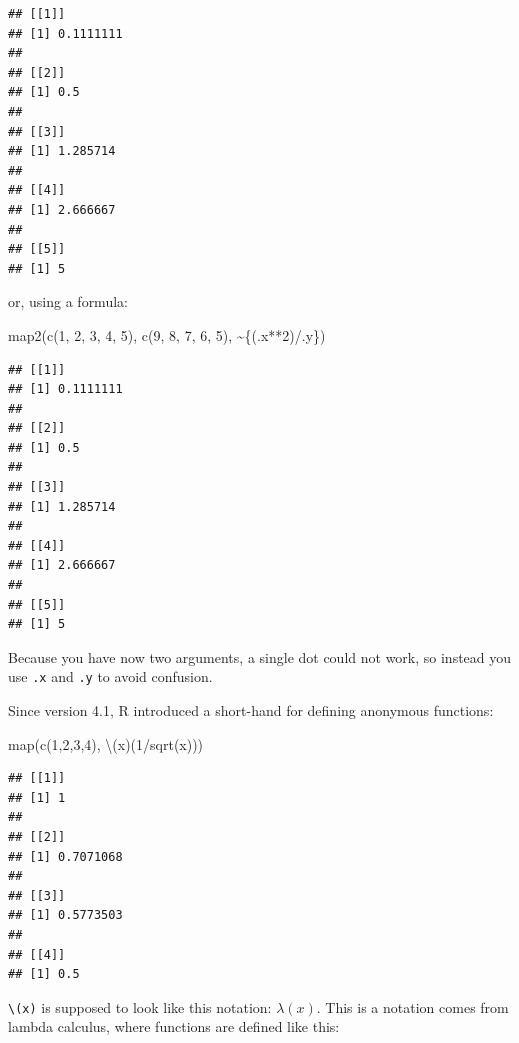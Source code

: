 \documentclass[
]{article}
\newenvironment{Shaded}{\begin{snugshade}}{\end{snugshade}}
\newcommand{\DecValTok}[1]{\textcolor[rgb]{0.00,0.00,0.81}{#1}}
\newcommand{\FunctionTok}[1]{\textcolor[rgb]{0.00,0.00,0.00}{#1}}
\newcommand{\NormalTok}[1]{#1}
\newcommand{\SpecialCharTok}[1]{\textcolor[rgb]{0.00,0.00,0.00}{#1}}
\begin{document}
\begin{verbatim}
## [[1]]
## [1] 0.1111111
## 
## [[2]]
## [1] 0.5
## 
## [[3]]
## [1] 1.285714
## 
## [[4]]
## [1] 2.666667
## 
## [[5]]
## [1] 5
\end{verbatim}

or, using a formula:

\begin{Shaded}
\begin{Highlighting}[]
\FunctionTok{map2}\NormalTok{(}\FunctionTok{c}\NormalTok{(}\DecValTok{1}\NormalTok{, }\DecValTok{2}\NormalTok{, }\DecValTok{3}\NormalTok{, }\DecValTok{4}\NormalTok{, }\DecValTok{5}\NormalTok{), }\FunctionTok{c}\NormalTok{(}\DecValTok{9}\NormalTok{, }\DecValTok{8}\NormalTok{, }\DecValTok{7}\NormalTok{, }\DecValTok{6}\NormalTok{, }\DecValTok{5}\NormalTok{), }\SpecialCharTok{\textasciitilde{}}\NormalTok{\{(.x}\SpecialCharTok{**}\DecValTok{2}\NormalTok{)}\SpecialCharTok{/}\NormalTok{.y\})}
\end{Highlighting}
\end{Shaded}

\begin{verbatim}
## [[1]]
## [1] 0.1111111
## 
## [[2]]
## [1] 0.5
## 
## [[3]]
## [1] 1.285714
## 
## [[4]]
## [1] 2.666667
## 
## [[5]]
## [1] 5
\end{verbatim}

Because you have now two arguments, a single dot could not work, so instead you use \texttt{.x} and \texttt{.y} to
avoid confusion.

Since version 4.1, R introduced a short-hand for defining anonymous functions:

\begin{Shaded}
\begin{Highlighting}[]
\FunctionTok{map}\NormalTok{(}\FunctionTok{c}\NormalTok{(}\DecValTok{1}\NormalTok{,}\DecValTok{2}\NormalTok{,}\DecValTok{3}\NormalTok{,}\DecValTok{4}\NormalTok{), \textbackslash{}(x)(}\DecValTok{1}\SpecialCharTok{/}\FunctionTok{sqrt}\NormalTok{(x)))}
\end{Highlighting}
\end{Shaded}

\begin{verbatim}
## [[1]]
## [1] 1
## 
## [[2]]
## [1] 0.7071068
## 
## [[3]]
## [1] 0.5773503
## 
## [[4]]
## [1] 0.5
\end{verbatim}

\texttt{\textbackslash{}(x)} is supposed to look like this notation: \(\lambda(x)\). This is a notation comes from lambda calculus, where functions
are defined like this:
\end{document}
